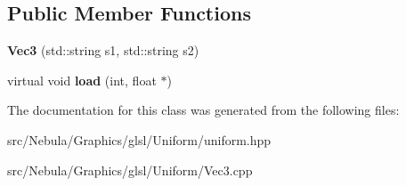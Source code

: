 \subsection*{\-Public \-Member \-Functions}
\begin{DoxyCompactItemize}
\item 
\hypertarget{classNeb_1_1glsl_1_1Uniform_1_1Vector_1_1Vec3_a1248082071bae8dbd4d346185c9b7185}{{\bfseries \-Vec3} (std\-::string s1, std\-::string s2)}\label{classNeb_1_1glsl_1_1Uniform_1_1Vector_1_1Vec3_a1248082071bae8dbd4d346185c9b7185}

\item 
\hypertarget{classNeb_1_1glsl_1_1Uniform_1_1Vector_1_1Vec3_ab6a541de14853990529d634b0971c28a}{virtual void {\bfseries load} (int, float $\ast$)}\label{classNeb_1_1glsl_1_1Uniform_1_1Vector_1_1Vec3_ab6a541de14853990529d634b0971c28a}

\end{DoxyCompactItemize}


\-The documentation for this class was generated from the following files\-:\begin{DoxyCompactItemize}
\item 
src/\-Nebula/\-Graphics/glsl/\-Uniform/uniform.\-hpp\item 
src/\-Nebula/\-Graphics/glsl/\-Uniform/\-Vec3.\-cpp\end{DoxyCompactItemize}
